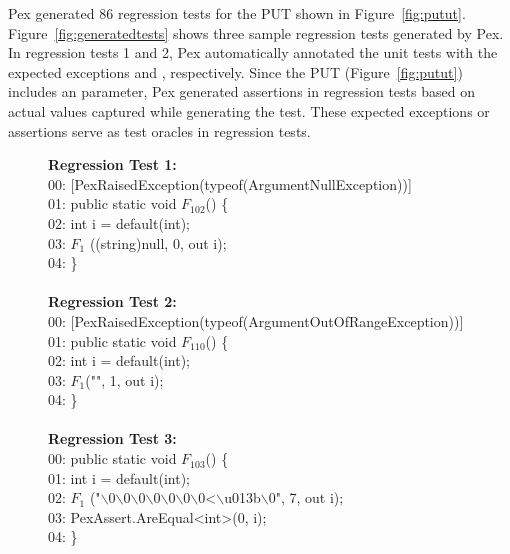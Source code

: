 Pex generated $86$ regression tests for the PUT shown in Figure~\ref{fig:putut}. 
Figure~\ref{fig:generatedtests} shows three sample regression tests generated by Pex.
In regression tests 1 and 2, Pex automatically annotated the unit tests with the expected exceptions
 and , respectively.
Since the PUT (Figure~\ref{fig:putut}) includes an  parameter, Pex 
generated assertions in regression tests based on actual values captured while 
generating the test. These expected exceptions or assertions serve as test oracles
in regression tests.

\begin{figure}[t]
\begin{CodeOut}
\textbf{Regression Test 1:}\\
00: [PexRaisedException(typeof(ArgumentNullException))]\\
01: public static void $F_{102}$() \{\\
02: \hspace*{0.2in}int i = default(int); \\
03: \hspace*{0.2in}$F_1$ ((string)null, 0, out i);\\
04: \}\\
\\
\textbf{Regression Test 2:}\\
00: [PexRaisedException(typeof(ArgumentOutOfRangeException))]\\
01: public static void $F_{110}$() \{\\
02: \hspace*{0.2in}int i = default(int);\\
03: \hspace*{0.2in}$F_1$("", 1, out i);\\
04: \}\\
\\
\textbf{Regression Test 3:}\\
00: public static void $F_{103}$() \{\\
01: \hspace*{0.2in}int i = default(int);\\
02: \hspace*{0.2in}$F_1$ ("$\backslash$0$\backslash$0$\backslash$0$\backslash$0$\backslash$0$\backslash$0$\backslash$0<$\backslash$u013b$\backslash$0", 7, out i); \\
03: \hspace*{0.2in}PexAssert.AreEqual<int>(0, i);\\
04: \}\\
\\
\end{CodeOut}\vspace*{-5ex}
\vspace*{-5ex}
\end{figure}

